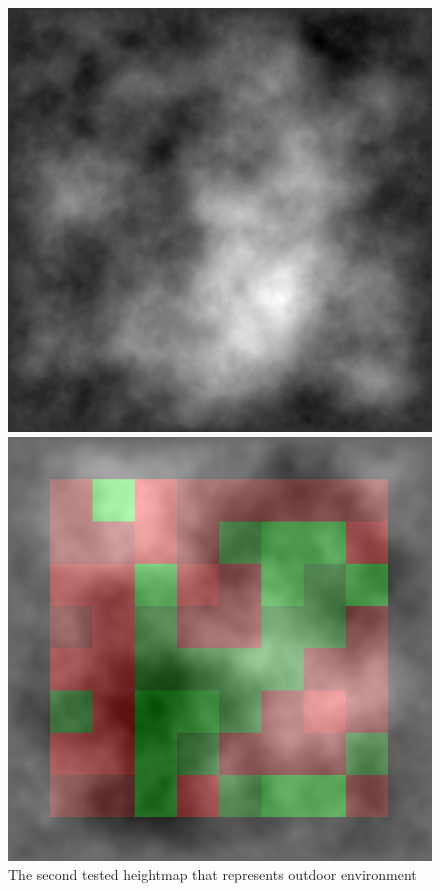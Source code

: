 \documentclass[]{usiinfbachelorproject}
\begin{document}
\begin{figure}[H]
  \includegraphics[width=\linewidth]{2dterrain}
    \caption{The second tested heightmap that represents outdoor environment}\label{fig:2dterrain}
\endminipage\hfill
{}
  \includegraphics[width=\linewidth]{heatmap0}

\end{figure}
\end{document}
